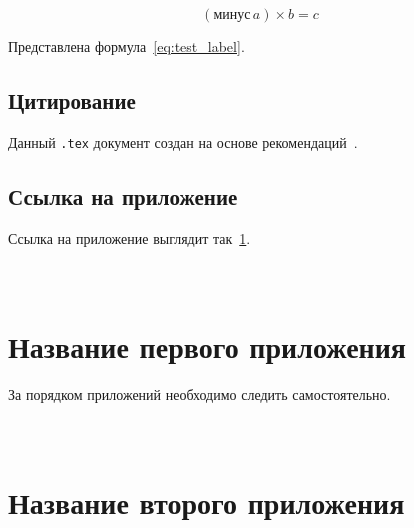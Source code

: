 \documentclass[14pt, a4paper, titlepage]{extarticle}
\begin{document}
\begin{equation}\label{eq:test_label}
    (\text{минус}\,a)\times b=c
\end{equation}

Представлена формула~\ref{eq:test_label}.

\subsection{Цитирование}

Данный \verb".tex" документ создан на основе рекомендаций~\parencite{bib:recomendations}.

\subsection{Ссылка на приложение}

Ссылка на приложение выглядит так~\ref{appendix:test_label}.


\clearpage
{}
\printbibliography[title={Список использованных источников}]


\appendix

\section[]{\\Название первого приложения}
\label{appendix:test_label}

За порядком приложений необходимо следить самостоятельно.

\section[]{\\Название второго приложения}
\end{document}
